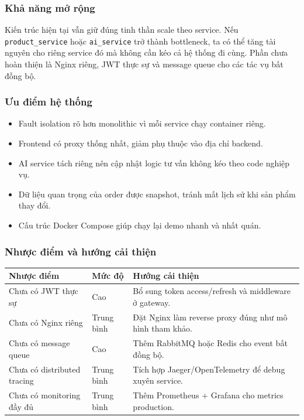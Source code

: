 \documentclass[12pt,a4paper]{article}
\begin{document}
\subsubsection{Khả năng mở rộng}
Kiến trúc hiện tại vẫn giữ đúng tinh thần scale theo service. Nếu \texttt{product\_service} hoặc \texttt{ai\_service} trở thành bottleneck, ta có thể tăng tài nguyên cho riêng service đó mà không cần kéo cả hệ thống đi cùng. Phần chưa hoàn thiện là Nginx riêng, JWT thực sự và message queue cho các tác vụ bất đồng bộ.

\subsubsection{Ưu điểm hệ thống}
\begin{itemize}
  \item Fault isolation rõ hơn monolithic vì mỗi service chạy container riêng.
  \item Frontend có proxy thống nhất, giảm phụ thuộc vào địa chỉ backend.
  \item AI service tách riêng nên cập nhật logic tư vấn không kéo theo code nghiệp vụ.
  \item Dữ liệu quan trọng của order được snapshot, tránh mất lịch sử khi sản phẩm thay đổi.
  \item Cấu trúc Docker Compose giúp chạy lại demo nhanh và nhất quán.
\end{itemize}

\subsubsection{Nhược điểm và hướng cải thiện}
\begin{longtable}{p{4.4cm}p{2.8cm}p{5.6cm}}
\toprule
\textbf{Nhược điểm} & \textbf{Mức độ} & \textbf{Hướng cải thiện} \\
\midrule
Chưa có JWT thực sự & Cao & Bổ sung token access/refresh và middleware ở gateway. \\
Chưa có Nginx riêng & Trung bình & Đặt Nginx làm reverse proxy đúng như mô hình tham khảo. \\
Chưa có message queue & Cao & Thêm RabbitMQ hoặc Redis cho event bất đồng bộ. \\
Chưa có distributed tracing & Trung bình & Tích hợp Jaeger/OpenTelemetry để debug xuyên service. \\
Chưa có monitoring đầy đủ & Trung bình & Thêm Prometheus + Grafana cho metrics production. \\
\bottomrule
\end{longtable}
\end{document}
